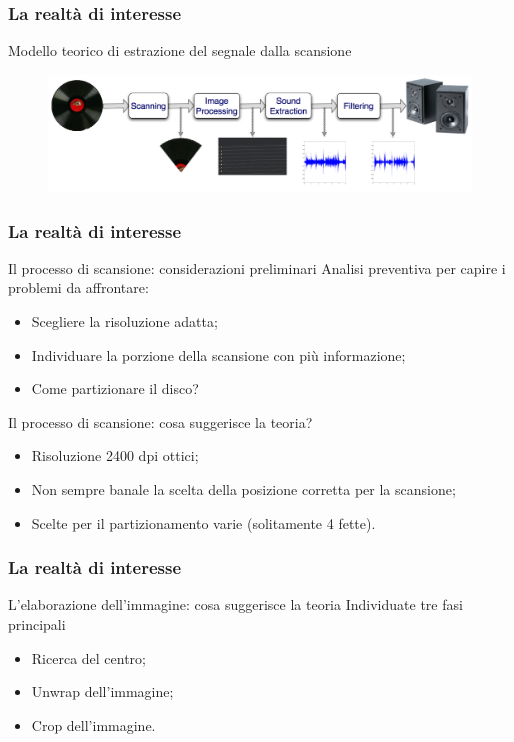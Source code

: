\begin{frame}
\frametitle{La realtà di interesse}
\begin{block}{Modello teorico di estrazione del segnale dalla scansione}
\begin{figure}
\includegraphics[width=1\textwidth]{immagini/block-scheme.png}
\end{figure}
\end{block}
\end{frame}

\begin{frame}
\frametitle{La realtà di interesse}
\begin{block}{Il processo di scansione: considerazioni preliminari}
Analisi preventiva per capire i problemi da affrontare:
\begin{itemize}
\item Scegliere la risoluzione adatta;
\item Individuare la porzione della scansione con più informazione;
\item Come partizionare il disco?
\end{itemize}
\end{block}

\begin{block}{Il processo di scansione: cosa suggerisce la teoria?}
\begin{itemize}
\item Risoluzione 2400 dpi ottici;
\item Non sempre banale la scelta della posizione corretta per la scansione;
\item Scelte per il partizionamento varie (solitamente 4 fette).
\end{itemize}
\end{block}
\end{frame}

\begin{frame}
\frametitle{La realtà di interesse}
\begin{block}{L'elaborazione dell'immagine: cosa suggerisce la teoria}
Individuate tre fasi principali
\begin{itemize}
\item Ricerca del centro;
\item Unwrap dell'immagine;
\item Crop dell'immagine.
\end{itemize}
\end{block}
\end{frame}

